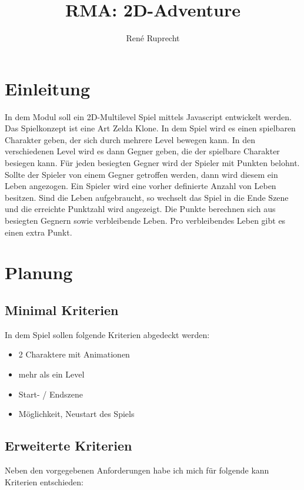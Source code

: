 \documentclass[12pt,a4paper]{article}
\begin{document}
\title{RMA: 2D-Adventure}
\author{René Ruprecht}
\maketitle
\tableofcontents
\clearpage
\setcounter{page}{1}
\newpage


\section{Einleitung}
In dem Modul soll ein 2D-Multilevel Spiel mittels Javascript entwickelt werden. Das Spielkonzept ist eine Art Zelda Klone.
In dem Spiel wird es einen spielbaren Charakter geben, der sich durch mehrere Level bewegen kann. In den verschiedenen Level wird es dann Gegner geben, die der spielbare Charakter besiegen kann. Für jeden besiegten Gegner wird der Spieler mit Punkten belohnt. Sollte der Spieler von einem Gegner getroffen werden, dann wird diesem ein Leben angezogen. Ein Spieler wird eine vorher definierte Anzahl von Leben besitzen. Sind die Leben aufgebraucht, so wechselt das Spiel in die \grqq Ende\grqq{} Szene und die erreichte Punktzahl wird angezeigt. Die Punkte berechnen sich aus besiegten Gegnern sowie verbleibende Leben. Pro verbleibendes Leben gibt es einen extra Punkt.

\section{Planung}
\subsection{Minimal Kriterien}
In dem Spiel sollen folgende Kriterien abgedeckt werden:
\begin{itemize}
    \item 2 Charaktere mit Animationen
    \item mehr als ein Level
    \item Start- / Endszene
    \item Möglichkeit, Neustart des Spiels
\end{itemize}

\newpage

\subsection{Erweiterte Kriterien}
Neben den vorgegebenen Anforderungen habe ich mich für folgende \grqq kann\grqq\\Kriterien entschieden:
\end{document}
